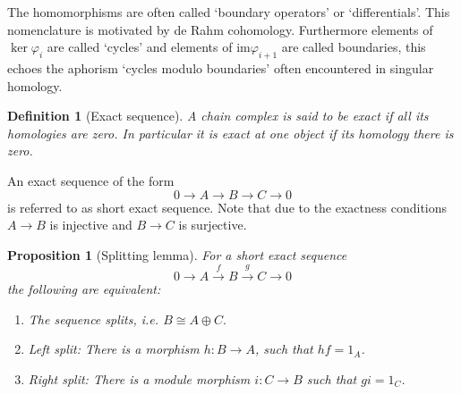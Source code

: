 \documentclass[12pt]{report}
\numberwithin{equation}{section}
\newcounter{dummy} \numberwithin{dummy}{section}
\newtheorem{definition}[dummy]{Definition}
\newtheorem{proposition}[dummy]{Proposition}
\begin{document}
	
	The homomorphisms are often called {`boundary operators'} or {`differentials'}. This nomenclature is motivated by de Rahm cohomology. Furthermore elements of $\ker \varphi_i$ are called `{cycles}' and elements of $\mathrm{im} \varphi_{i+1}$ are called {boundaries}, this echoes the aphorism `cycles modulo boundaries' often encountered in singular homology.
	\begin{definition}[Exact sequence]
		A chain complex is said to be {exact} if all its homologies are zero. In particular it is exact at one object if its homology there is zero.
	\end{definition}
	 An exact sequence of the form \[ 0 \to A \to B \to C \to 0 \]
	is referred to as short exact sequence. Note that due to the exactness conditions $A \to B $ is injective and $B \to C$ is surjective.
	\begin{proposition}[Splitting lemma]
		For a short exact sequence $$0 \to A \xrightarrow{f} B \xrightarrow{g} C \to 0$$ the following are equivalent:
		\begin{enumerate}
			\item The sequence splits, i.e. $B \cong A \oplus C.$
			\item Left split: There is a morphism $h:B \to A $, such that $hf=1_A$.
			\item Right split: There is a module morphism $i: C \to B $ such that $gi=1_C$.
		\end{enumerate}
	\end{proposition}
%		
%		
	
\end{document}
